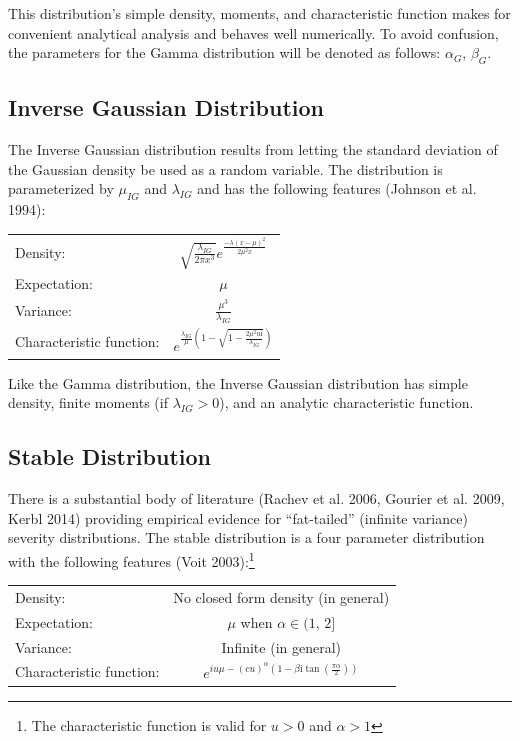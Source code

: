 \documentclass{article}
\theoremstyle{definition}
\begin{document}
This distribution's simple density, moments, and characteristic function makes for convenient analytical analysis and behaves well numerically.  To avoid confusion, the parameters for the Gamma distribution will be denoted as follows: \(\alpha_G\), \(\beta_G\).

\subsection{Inverse Gaussian Distribution}

The Inverse Gaussian distribution results from letting the standard deviation of the Gaussian density be used as a random variable.  The distribution is parameterized by \(\mu_{IG}\) and \(\lambda_{IG}\) and has the following features (Johnson et al. 1994):


\begin{center}
\begin{tabular}{lc}
Density: & \(\sqrt{\frac{\lambda_{IG}}{2\pi x^3}}e^{\frac{-\lambda(x-\mu)^2}{2\mu^2 x}}\)\\
Expectation: & \(\mu\) \\
Variance: & \(\frac{\mu^3}{\lambda_{IG}}\) \\
Characteristic function: & \(e^{\frac{\lambda_{IG}}{\mu} \left(1-\sqrt{1-\frac{2\mu^2 u\mathrm{i}}{\lambda_{IG}}}\right)}\)
\end{tabular}
\end{center}

Like the Gamma distribution, the Inverse Gaussian distribution has simple density, finite moments (if \(\lambda_{IG}>0\)), and an analytic characteristic function.

\subsection{Stable Distribution}

There is a substantial body of literature (Rachev et al. 2006, Gourier et al. 2009, Kerbl 2014) providing empirical evidence for ``fat-tailed'' (infinite variance) severity distributions. The stable distribution is a four parameter distribution with the following features (Voit 2003):\footnote{The characteristic function is valid for \(u>0\) and \(\alpha>1\)}

\begin{center}
\begin{tabular}{lc}
Density: & No closed form density (in general)\\
Expectation: & \(\mu\) when \(\alpha \in (1,\,2]\)\\
Variance: & Infinite (in general)\\
Characteristic function: & \(e^{iu\mu-(cu)^\alpha \left(1-\beta \mathrm{i} \tan\left(\frac{\pi \alpha}{2}\right)\right)}\)
\end{tabular}
\end{center}
\end{document}
